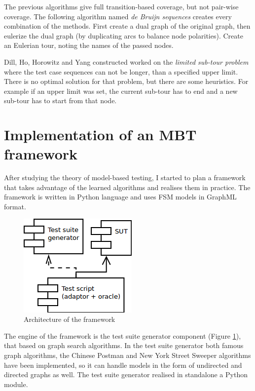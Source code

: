 \documentclass{article}
\begin{document}
The previous algorithms give full transition-based coverage, but not pair-wise coverage. The following algorithm named \textit{de Bruijn sequences} creates every combination of the methods. First create a dual graph of the original graph, then eulerize the dual graph (by duplicating arcs to balance node polarities). Create an Eulerian tour, noting the names of the passed nodes.

Dill, Ho, Horowitz and Yang constructed worked on the \textit{limited sub-tour problem} where the test case sequences can not be longer, than a specified upper limit. There is no optimal solution for that problem, but there are some heuristics. For example if an upper limit was set, the current sub-tour has to end and a new sub-tour has to start from that node.


\section{Implementation of an MBT framework}
\label{sec:implementation}

After studying the theory of model-based testing, I started to plan a framework that takes advantage of the learned algorithms and realises them in practice. The framework is written in Python language and uses FSM models in GraphML format.

\begin{figure}[htp]
\centering
\includegraphics[scale=0.5]{img/architecture.png}
\caption{Architecture of the framework}
\label{fig:architecture}
\end{figure}

The engine of the framework is the test suite generator component (Figure \ref{fig:architecture}), that based on graph search algorithms. In the test suite generator both famous graph algorithms, the Chinese Postman and New York Street Sweeper algorithms have been implemented, so it can handle models in the form of undirected and directed graphs as well. The test suite generator realised in standalone a Python module.
\end{document}
